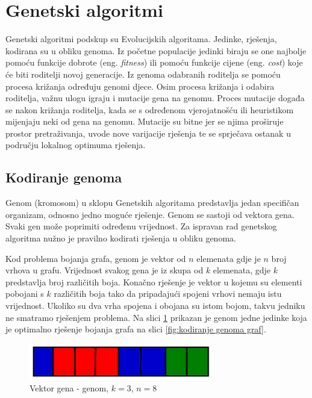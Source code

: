 \documentclass[times, utf8, zavrsni]{fer}
\begin{document}
\section{Genetski algoritmi}
Genetski algoritmi podskup su Evolucijskih algoritama. Jedinke, rješenja, kodirana su u obliku genoma. Iz početne populacije jedinki biraju se one najbolje pomoću funkcije dobrote (eng. \textit{fitness}) ili pomoću funkcije cijene (eng. \textit{cost}) koje će biti roditelji novoj generacije. Iz genoma odabranih roditelja se pomoću procesa križanja određuju genomi djece. Osim procesa križanja i odabira roditelja, važnu ulogu igraju i mutacije gena na genomu. Proces mutacije događa se nakon križanja roditelja, kada se s određenom vjerojatnošću ili heuristikom mijenjaju neki od gena na genomu. Mutacije su bitne jer se njima proširuje prostor pretraživanja, uvode nove varijacije rješenja te se sprječava ostanak u području lokalnog optimuma rješenja.

\subsection{Kodiranje genoma}
Genom (kromosom) u sklopu Genetskih algoritama predstavlja jedan specifičan organizam, odnosno jedno moguće rješenje. Genom se sastoji od vektora gena. Svaki gen može poprimiti određenu vrijednost. Za ispravan rad genetskog algoritma nužno je pravilno kodirati rješenja u obliku genoma.

Kod problema bojanja grafa, genom je vektor od $n$ elemenata gdje je $n$ broj vrhova u grafu. Vrijednost svakog gena je iz skupa od $k$ elemenata, gdje $k$ predstavlja broj različitih boja. Konačno rješenje je vektor u kojemu su elementi pobojani s $k$ različitih boja tako da pripadajući spojeni vrhovi nemaju istu vrijednost. Ukoliko su dva vrha spojena i obojana su istom bojom, takvu jedniku ne smatramo rješenjem problema. Na slici \ref{fig:kodirani genom} prikazan je genom jedne jedinke koja je optimalno rješenje bojanja grafa na slici \ref{fig:kodiranje genoma graf}.

\begin{figure}[htb]
\centering
\includegraphics[width=8cm]{images/genom_encoding.png}
\caption{Vektor gena - genom, $k=3$, $n=8$}
\label{fig:kodirani genom}
\end{figure}
\end{document}
